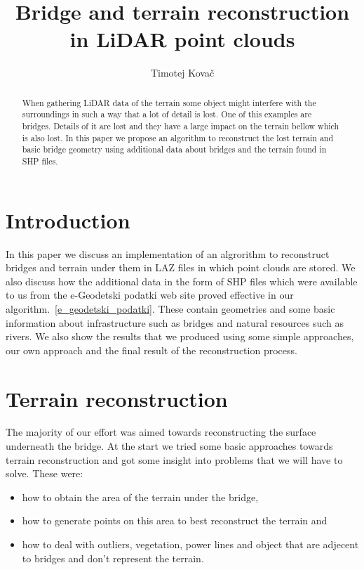 \documentclass{egpubl-eurovis-star}
\title[EG \LaTeX\ Author Guidelines]%
      {Bridge and terrain reconstruction in LiDAR point clouds}
\author[submission ID]{Timotej Kovač}
\begin{document}

\maketitle

\begin{abstract}
When gathering LiDAR data of the terrain some object might interfere with the surroundings in such a way that a lot of detail is lost.
One of this examples are bridges.
Details of it are lost and they have a large impact on the terrain bellow which is also lost.
In this paper we propose an algorithm to reconstruct the lost terrain and basic bridge geometry using additional data about bridges and the terrain found in SHP files.
\end{abstract}



\section{Introduction}
In this paper we discuss an implementation of an algrorithm to reconstruct bridges and terrain under them in LAZ files in which point clouds are stored.
We also discuss how the additional data in the form of SHP files which were available to us from the e-Geodetski podatki web site proved effective in our algorithm.~\ref{e_geodetski_podatki}.
These contain geometries and some basic information about infrastructure such as bridges and natural resources such as rivers.
We also show the results that we produced using some simple approaches, our own approach and the final result of the reconstruction process.

\section{Terrain reconstruction}

The majority of our effort was aimed towards reconstructing the surface underneath the bridge.
At the start we tried some basic approaches towards terrain reconstruction and got some insight into problems that we will have to solve.
These were:
\begin{itemize}
\item{how to obtain the area of the terrain under the bridge,}
\item{how to generate points on this area to best reconstruct the terrain and}
\item{how to deal with outliers, vegetation, power lines and object that are adjecent to bridges and don't represent the terrain.}
\end{itemize}
\end{document}
